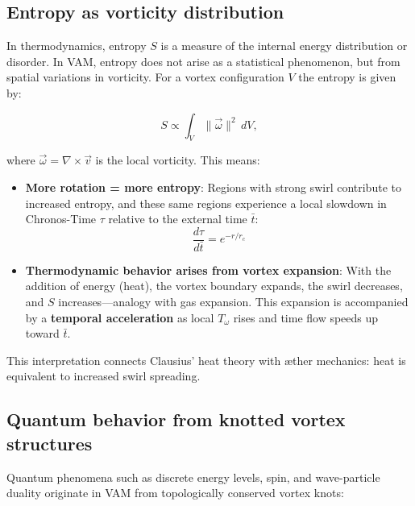 \documentclass[preprint]{revtex4-2}
\begin{document}
\subsection{Entropy as vorticity distribution}

In thermodynamics, entropy $S$ is a measure of the internal energy distribution or disorder. In VAM, entropy does not arise as a statistical phenomenon, but from spatial variations in vorticity. For a vortex configuration $V$ the entropy is given by:

\begin{equation}
    S \propto \int_V \|\vec{\omega}\|^2 \, dV,
\end{equation}

where $\vec{\omega} = \nabla \times \vec{v}$ is the local vorticity. This means:

\begin{itemize}
    \item \textbf{More rotation = more entropy}:
    Regions with strong swirl contribute to increased entropy,
    and these same regions experience a local slowdown in Chronos-Time $\tau$ relative to the external time $\bar{t}$:
    \[
        \frac{d\tau}{d\bar{t}} = e^{-r/r_c}
    \]

    \item \textbf{Thermodynamic behavior arises from vortex expansion}:
    With the addition of energy (heat), the vortex boundary expands, the swirl decreases, and $S$ increases—analogy with gas expansion.
    This expansion is accompanied by a \textbf{temporal acceleration} as local $T_\omega$ rises and time flow speeds up toward $\bar{t}$.
\end{itemize}


This interpretation connects Clausius' heat theory with æther mechanics: heat is equivalent to increased swirl spreading.

\subsection{Quantum behavior from knotted vortex structures}

Quantum phenomena such as discrete energy levels, spin, and wave-particle duality originate in VAM from topologically conserved vortex knots:
\end{document}
